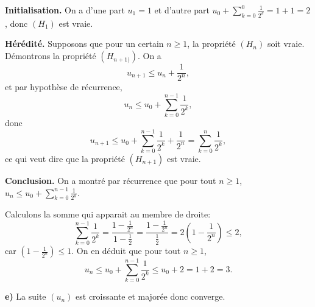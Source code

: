 \documentclass[12pt, a4paper,oneside]{article} %
\begin{document}
\textbf{Initialisation.}
On a d'une part
$ u_{1} = 1 $ 
et d'autre part
$ u_{0} + \sum_{k=0}^{0} \frac{1}{2^{k} } = 1 + 1 = 2 $,
donc $ (H_{1}) $ est vraie.

\textbf{Hérédité.}
Supposons que pour un certain
$ n \ge 1 $, 
la propriété $ (H_{n}) $
soit vraie.
Démontrons la propriété
$ (H_{n+1)}) $.
On a
\begin{equation}
	u_{n+1}
	\le
	u_{n}
	+
	\frac{1}{2^{n} }
	,
\end{equation}
et par hypothèse de récurrence,
\begin{equation}
	u_{n}
	\le
	u_{0}
	+
	\sum_{k=0}^{n-1} 
	\frac{1}{2^{k} }
	,
\end{equation}
donc
\begin{equation}
	u_{n+1}
	\le
	u_{0}
	+
	\sum_{k=0}^{n-1} 
	\frac{1}{2^{k} }
	+
	\frac{1}{2^{n} }
	=
	\sum_{k=0}^{n} 
	\frac{1}{2^{k} }
	,
\end{equation}
ce qui veut dire 
que la propriété
$ (H_{n+1}) $ 
est vraie.

\textbf{Conclusion.}
On a montré par récurrence que
pour tout $ n \ge 1 $,
$
u_{n}
\le
u_{0}
+
\sum_{k=0}^{n-1} 
\frac{1}{2^{k} }
$.

Calculons la somme qui apparait
au membre de droite:
\begin{equation}
	\sum_{k=0}^{n-1} 
	\frac{1}{2^{k} }
	=
	\frac{1 - \frac{1}{2^{n} }}
	{1 - \frac{1}{2}}
	=
	\frac{1 - \frac{1}{2^{n}} }
	{\frac{1}{2}}
	=
	2
	(1 - \frac{1}{2^{n}})
	\le
	2
	,
\end{equation}
car
$
(1 - \frac{1}{2^{n}}) \le 1
$.
On en déduit que pour
tout $ n \ge 1 $,
\begin{equation}
	u_{n}
	\le
	u_{0}
	+
	\sum_{k=0}^{n-1} 
	\frac{1}{2^{k} }
	\le
	u_{0}
	+ 2
	= 1 + 2 = 3
	.
\end{equation}

\textbf{e)}
La suite $ (u_{n}) $ 
est croissante
et majorée
donc converge.






\end{document}
